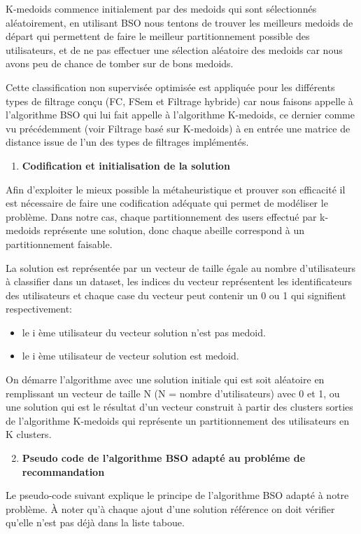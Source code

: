 K-medoids commence initialement par des medoids qui sont sélectionnés aléatoirement, en utilisant BSO nous tentons de trouver les meilleurs medoids de départ qui permettent de faire le meilleur partitionnement possible des utilisateurs, et de ne pas effectuer une sélection aléatoire des medoids car nous avons peu de chance de tomber sur de bons medoids.

Cette classification non supervisée optimisée est appliquée pour les différents types de filtrage conçu (FC, FSem et Filtrage hybride) car 
nous faisons appelle à l'algorithme BSO qui lui fait appelle à l'algorithme K-medoids, ce dernier comme vu précédemment (voir Filtrage basé sur K-medoids) à en entrée une matrice de distance issue de l'un des types de filtrages implémentés.\\

\begin{enumerate}[nosep,label=\textbf{\arabic*)}]
	\item \textbf{Codification et initialisation de la solution}
\end{enumerate}\mbox{}\indent Afin d'exploiter le mieux possible la métaheuristique et prouver son efficacité il est nécessaire de faire une codification adéquate qui permet de modéliser le problème.
Dans notre cas, chaque partitionnement des users effectué par k-medoids représente une solution, donc chaque abeille correspond à un partitionnement faisable.

La solution est représentée par un vecteur de taille égale au nombre d'utilisateurs à classifier dans un dataset, les indices du vecteur représentent les identificateurs des utilisateurs et chaque case du vecteur peut contenir un 0 ou 1 qui signifient respectivement:
\begin{itemize}
	\item le i ème utilisateur du vecteur solution n'est pas medoid.
	\item le i ème  utilisateur de vecteur solution est medoid.
\end{itemize}

On démarre l'algorithme avec une solution initiale qui est soit aléatoire en remplissant un vecteur de taille N (N = nombre d'utilisateurs) avec 0 et 1, ou une solution qui est le résultat d'un vecteur construit à partir des clusters sorties de l'algorithme K-medoids qui représente un partitionnement des utilisateurs en K clusters.\\

\begin{enumerate}[nosep,label=\textbf{\arabic*)}]
	\setcounter{enumi}{1}
	\item \textbf{Pseudo code de l'algorithme BSO adapté au probléme de recommandation}
\end{enumerate}\mbox{}\indent Le pseudo-code suivant explique le principe de l'algorithme BSO adapté à notre problème. À noter qu'à chaque ajout d'une solution référence on doit vérifier qu'elle n'est pas déjà dans la liste taboue.  


